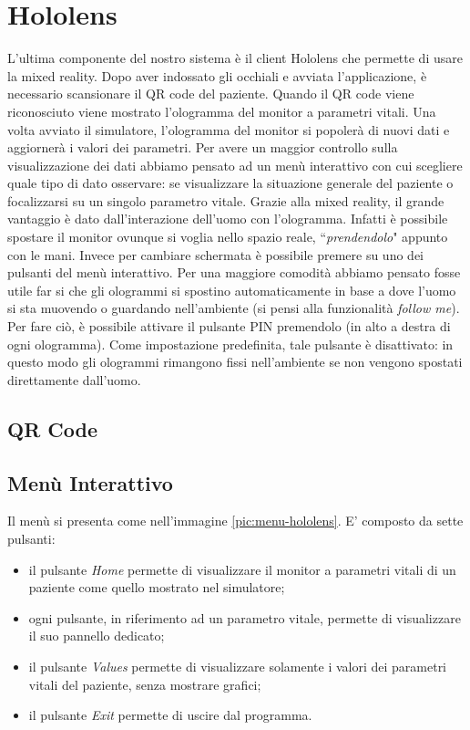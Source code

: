 \section{Hololens}
L'ultima componente del nostro sistema è il client Hololens che permette di usare la mixed reality. Dopo aver indossato gli occhiali e avviata l'applicazione, è necessario scansionare il QR code del paziente. Quando il QR code viene riconosciuto viene mostrato l'ologramma del monitor a parametri vitali. Una volta avviato il simulatore, l'ologramma del monitor si popolerà di nuovi dati e aggiornerà i valori dei parametri. Per avere un maggior controllo sulla visualizzazione dei dati abbiamo pensato ad un menù interattivo con cui scegliere quale tipo di dato osservare: se visualizzare la situazione generale del paziente o focalizzarsi su un singolo parametro vitale. Grazie alla mixed reality, il grande vantaggio è dato dall'interazione dell'uomo con l'ologramma. Infatti è possibile spostare il monitor ovunque si voglia nello spazio reale, ``\textit{prendendolo}" appunto con le mani. Invece per cambiare schermata è possibile premere su uno dei pulsanti del menù interattivo. Per una maggiore comodità abbiamo pensato fosse utile far si che gli ologrammi si spostino automaticamente in base a dove l'uomo si sta muovendo o guardando nell'ambiente (si pensi alla funzionalità \textit{follow me}). Per fare ciò, è possibile attivare il pulsante PIN  premendolo (in alto a destra di ogni ologramma). Come impostazione predefinita, tale pulsante è disattivato: in questo modo gli ologrammi rimangono fissi nell'ambiente se non vengono spostati direttamente dall'uomo.

\subsection{QR Code}

\subsection{Menù Interattivo}
Il menù si presenta come nell'immagine \ref{pic:menu-hololens}. E' composto da sette pulsanti:
\begin{itemize}
    \item il pulsante \textit{Home} permette di visualizzare il monitor a parametri vitali di un paziente come quello mostrato nel simulatore;
    
    \item ogni pulsante, in riferimento ad un parametro vitale, permette di visualizzare il suo pannello dedicato;
    
    \item il pulsante \textit{Values} permette di visualizzare solamente i valori dei parametri vitali del paziente, senza mostrare grafici;
    
    \item il pulsante \textit{Exit} permette di uscire dal programma.
\end{itemize}

